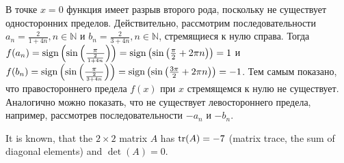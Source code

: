 \documentclass[addpoints, answers]{exam} %
\begin{document}
\begin{questions}
\begin{solution}
В точке $x=0$ функция имеет разрыв второго рода, поскольку не существует односторонних пределов. Действительно, рассмотрим последовательности $a_n = \frac{2}{1+4 n}, n
\in \mathbb{N}$ и $b_n = \frac{2}{3+4 n}, n \in \mathbb{N}$, стремящиеся к нулю справа. Тогда $f(a_n) = {\operatorname{sign}} \left(\sin \left( \frac{\pi}{\frac{2}{1+4 n}}\right)\right) = {\operatorname{sign}} \left( \sin \left( \frac{\pi}{2} + 2 \pi n \right)\right)=1$ и $f(b_n) = {\operatorname{sign}} \left(\sin \left( \frac{\pi}{\frac{2}{3+4 n}}\right)\right) = {\operatorname{sign}} \left( \sin \left( \frac{3 \pi}{2} + 2 \pi n \right)\right)=-1$. Тем самым показано, что правостороннего предела $f(x)$ при $x$ стремящемся к нулю не существует. Аналогично можно показать, что не существует левостороннего предела, например, рассмотрев последовательности $-a_n$ и $-b_n$.
\end{solution}





\question It is known, that the $2 \times 2$ matrix $A$ has $\operatorname{tr}(A) = -7$ (matrix trace, the sum of diagonal elements) and $\det(A) = 0$.

\end{questions}
\end{document}
